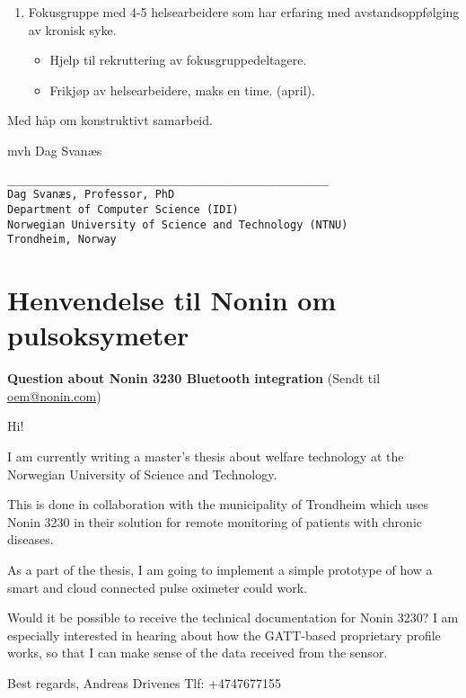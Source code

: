 \begin{enumerate}
\def\labelenumi{\arabic{enumi}.}
\setcounter{enumi}{1}
\tightlist
\item
  Fokusgruppe med 4-5 helsearbeidere som har erfaring med
  avstandsoppfølging av kronisk syke.

  \begin{itemize}
  \tightlist
  \item
    Hjelp til rekruttering av fokusgruppedeltagere.
  \item
    Frikjøp av helsearbeidere, maks en time. (april).
  \end{itemize}
\end{enumerate}

Med håp om konstruktivt samarbeid.

mvh
Dag Svanæs

\begin{verbatim}
__________________________________________________
Dag Svanæs, Professor, PhD
Department of Computer Science (IDI)
Norwegian University of Science and Technology (NTNU)
Trondheim, Norway
\end{verbatim}

\chapter{Henvendelse til Nonin om pulsoksymeter}
\label{appendix:pulsoksymeter}
\textbf{Question about Nonin 3230 Bluetooth integration}
(Sendt til \url{oem@nonin.com})

Hi!

I am currently writing a master's thesis about welfare technology at the Norwegian University of Science and Technology. 

This is done in collaboration with the municipality of Trondheim which uses Nonin 3230 in their
solution for remote monitoring of patients with chronic diseases. 

As a part of the thesis, I am going to implement a simple prototype of how a smart and cloud connected pulse oximeter could work.

Would it be possible to receive the technical documentation for Nonin 3230?
I am especially interested in hearing about how the GATT-based proprietary profile works, so
that I can make sense of the data received from the sensor. 

Best regards,\newline
Andreas Drivenes\newline
Tlf: +4747677155

